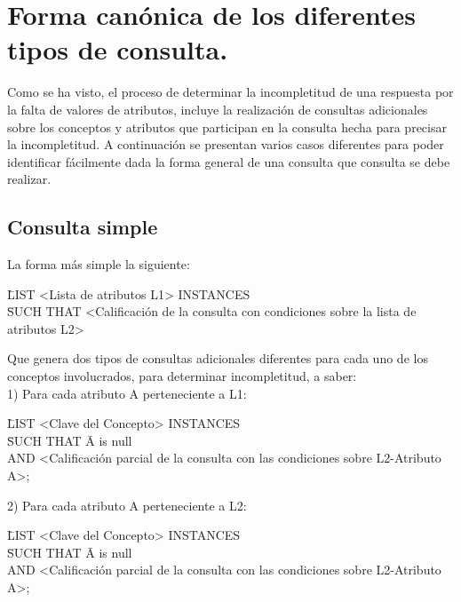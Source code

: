 \section{Forma canónica de los diferentes tipos de consulta.}\label{section-formaCanonica}

Como se ha visto, el proceso de determinar la incompletitud de una respuesta por la falta de valores de atributos, incluye la realización de consultas adicionales sobre los conceptos y atributos que participan en la consulta hecha para precisar la incompletitud. A continuación se presentan varios casos diferentes para poder identificar fácilmente dada la forma general de una consulta que consulta se debe realizar. \\

\subsection{Consulta simple}

La forma más simple la siguiente: 

\begin{tabbing}	
\= LIST \textless Lista de atributos L1\textgreater \+ INSTANCES \\
\= SUCH THAT \textless Calificación de la consulta con condiciones sobre la lista de atributos L2\textgreater \\
\end{tabbing}

Que genera dos tipos  de consultas adicionales diferentes para cada uno de los conceptos involucrados, para determinar incompletitud, a saber: \\

1) Para cada atributo A perteneciente a L1: 

\begin{tabbing}	
\= LIST \textless Clave del Concepto\textgreater \+ INSTANCES \\
\= SUCH THAT \= A is null \\ 
\> \> AND \textless  Calificación parcial de la consulta con las condiciones sobre L2-{Atributo A}\textgreater ; \\
\end{tabbing}

2) Para cada atributo A perteneciente a L2: 

\begin{tabbing}	
\= LIST \textless Clave del Concepto\textgreater \+ INSTANCES \\
\= SUCH THAT \= A is null \\ 
\> \> AND \textless Calificación parcial de la consulta con las condiciones sobre L2-{Atributo A}\textgreater ; \\
\end{tabbing}

